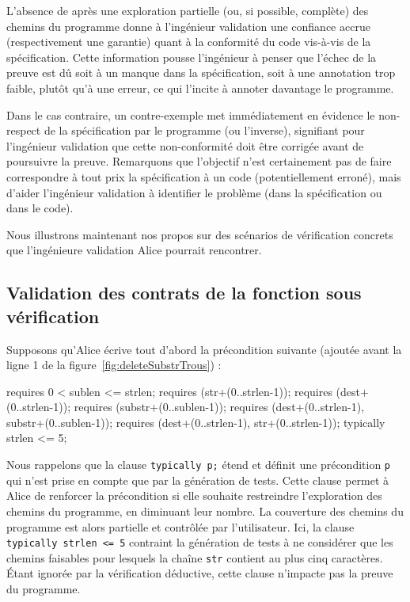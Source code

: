 L'absence de \NCCE après une exploration partielle (ou, si possible, complète)
des chemins du programme donne à l'ingénieur validation une confiance accrue
(respectivement une garantie) quant à la conformité du code vis-à-vis de la
spécification.
Cette information pousse l'ingénieur à penser que l'échec de la preuve est dû 
soit à un manque dans la spécification, soit à une annotation trop faible,
plutôt qu'à une erreur, ce qui l'incite à annoter davantage le programme.

Dans le cas contraire, un contre-exemple met immédiatement en évidence le
non-respect de la spécification par le programme (ou l'inverse), signifiant pour
l'ingénieur validation que cette non-conformité doit être corrigée avant de
poursuivre la preuve.
Remarquons que l'objectif n'est certainement pas de faire correspondre à tout
prix la spécification à un code (potentiellement erroné), mais d'aider
l'ingénieur validation à identifier le problème (dans la spécification ou dans
le code).

Nous illustrons maintenant nos propos sur des scénarios de vérification
concrets que l'ingénieure validation Alice pourrait rencontrer.


\subsection{Validation des contrats de la fonction sous vérification}
\label{sec:ncd-early}


Supposons qu'Alice écrive tout d'abord la précondition suivante (ajoutée avant
la ligne 1 de la figure~\ref{fig:deleteSubstrTrous}) :

\begin{pretty-codeACSL}
requires 0 < sublen <= strlen;
requires \valid(str+(0..strlen-1));
requires \valid(dest+(0..strlen-1));
requires \valid(substr+(0..sublen-1));
requires \separated(dest+(0..strlen-1), substr+(0..sublen-1));
requires \separated(dest+(0..strlen-1), str+(0..strlen-1));
typically strlen <= 5;
\end{pretty-codeACSL}

Nous rappelons que la clause \lstinline'typically p;' étend \eacsl et définit
une précondition \lstinline'p' qui n'est prise en compte que par la génération
de tests.
Cette clause permet à Alice de renforcer la précondition si elle souhaite
restreindre l'exploration des chemins du programme, en diminuant leur nombre.
La couverture des chemins du programme est alors partielle et contrôlée par
l'utilisateur.
Ici, la clause \lstinline'typically strlen <= 5' contraint la génération de
tests à ne considérer que les chemins faisables pour lesquels la chaîne
\lstinline'str' contient au plus cinq caractères.
Étant ignorée par la vérification déductive, cette clause n'impacte pas la
preuve du programme.

